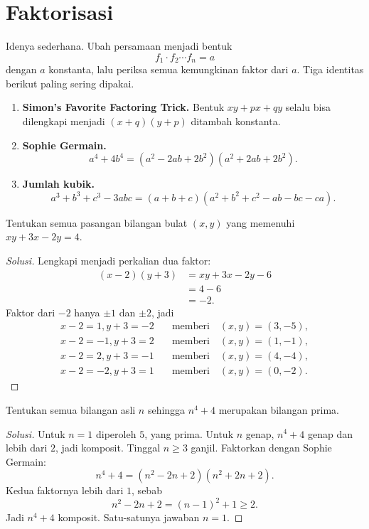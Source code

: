 \documentclass[12pt]{scrartcl}
\begin{document}
\section{Faktorisasi}

Idenya sederhana. Ubah persamaan menjadi bentuk
\[ f_1 \cdot f_2 \cdots f_n = a \]
dengan $a$ konstanta, lalu periksa semua kemungkinan faktor dari $a$.
Tiga identitas berikut paling sering dipakai.

\begin{fact}
\begin{enumerate}
    \item \textbf{Simon's Favorite Factoring Trick.} Bentuk $xy + px + qy$
    selalu bisa dilengkapi menjadi $(x + q)(y + p)$ ditambah konstanta.
    \item \textbf{Sophie Germain.}
    \[ a^4 + 4b^4 = (a^2 - 2ab + 2b^2)(a^2 + 2ab + 2b^2). \]
    \item \textbf{Jumlah kubik.}
    \[ a^3 + b^3 + c^3 - 3abc = (a + b + c)(a^2 + b^2 + c^2 - ab - bc - ca). \]
\end{enumerate}
\end{fact}

\begin{example}
Tentukan semua pasangan bilangan bulat $(x, y)$ yang memenuhi $xy + 3x - 2y = 4$.
\end{example}
\begin{proof}[Solusi]
Lengkapi menjadi perkalian dua faktor:
\begin{align*}
(x - 2)(y + 3) &= xy + 3x - 2y - 6 \\
&= 4 - 6 \\
&= -2.
\end{align*}
Faktor dari $-2$ hanya $\pm 1$ dan $\pm 2$, jadi
\begin{align*}
x - 2 = 1, y + 3 = -2 &\quad \text{memberi} \quad (x, y) = (3, -5), \\
x - 2 = -1, y + 3 = 2 &\quad \text{memberi} \quad (x, y) = (1, -1), \\
x - 2 = 2, y + 3 = -1 &\quad \text{memberi} \quad (x, y) = (4, -4), \\
x - 2 = -2, y + 3 = 1 &\quad \text{memberi} \quad (x, y) = (0, -2).
\end{align*}
\end{proof}

\begin{example}
Tentukan semua bilangan asli $n$ sehingga $n^4 + 4$ merupakan bilangan prima.
\end{example}
\begin{proof}[Solusi]
Untuk $n = 1$ diperoleh $5$, yang prima.
Untuk $n$ genap, $n^4 + 4$ genap dan lebih dari $2$, jadi komposit.
Tinggal $n \ge 3$ ganjil. Faktorkan dengan Sophie Germain:
\[ n^4 + 4 = (n^2 - 2n + 2)(n^2 + 2n + 2). \]
Kedua faktornya lebih dari $1$, sebab
\[ n^2 - 2n + 2 = (n - 1)^2 + 1 \ge 2. \]
Jadi $n^4 + 4$ komposit. Satu-satunya jawaban $n = 1$.
\end{proof}
\end{document}
